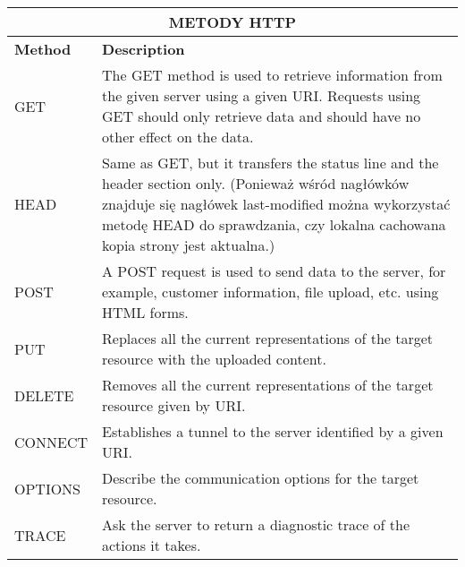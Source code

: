 \documentclass[../main.tex]{subfiles}
\begin{document}
    \begin{table}[H]
        \begin{center}
            \begin{tabular}{|p{4cm}|p{11cm}|}
                \hline
                \multicolumn{2}{|c|}{\textbf{METODY HTTP}}\\
                \hline
                \textbf{Method} & \textbf{Description}\\
                \hline
                \hline
                GET
                &
                The GET method is used to retrieve information from the given server using a given URI. Requests using GET should only retrieve data and should have no other effect on the data.
                \\
                \hline

                HEAD
                &
                Same as GET, but it transfers the status line and the header section only. (Ponieważ wśród nagłówków znajduje się nagłówek last-modified można wykorzystać metodę HEAD do sprawdzania, czy lokalna cachowana kopia strony jest aktualna.)
                \\
                \hline
                POST
                &
                A POST request is used to send data to the server, for example, customer information, file upload, etc. using HTML forms.\\
                \hline
                PUT
                &
                Replaces all the current representations of the target resource with the uploaded content.\\
                \hline
                DELETE
                &
                Removes all the current representations of the target resource given by URI.\\
                \hline
                CONNECT
                &
                Establishes a tunnel to the server identified by a given URI.\\
                \hline
                OPTIONS
                &
                Describe the communication options for the target resource.\\
                \hline
                TRACE
                &
                Ask the server to return a diagnostic trace of the actions it takes.\\
                \hline
            \end{tabular}
        \end{center}
    \end{table}
\end{document}
